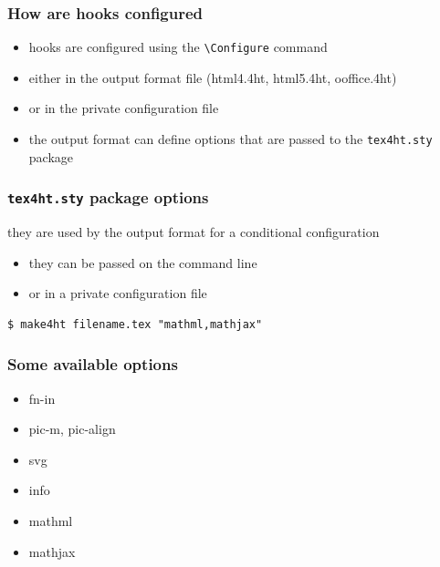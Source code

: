 \begin{frame}
  \frametitle{How are hooks configured}
  \begin{itemize}
    \item hooks are configured using the \texttt{\textbackslash Configure} command
    \item either in the output format file (html4.4ht, html5.4ht, ooffice.4ht)
    \item or in the private configuration file
    \item the output format can define options that are passed to the \texttt{tex4ht.sty} package

\end{itemize}
\end{frame}

\begin{frame}[fragile]
  \frametitle{\texttt{tex4ht.sty} package options}
    they are used by the output format for a conditional configuration

  \begin{itemize}
    \item they can be passed on the command line
    \item or in a private configuration file 
  \end{itemize}
  \begin{priklad}
\begin{verbatim}
$ make4ht filename.tex "mathml,mathjax"
\end{verbatim}
\end{priklad}
\end{frame}

\begin{frame}
  \frametitle{Some available options}
\begin{itemize}
  \item fn-in
  \item pic-m, pic-align
  \item svg
  \item info
  \item mathml
  \item mathjax
\end{itemize}
\end{frame}


